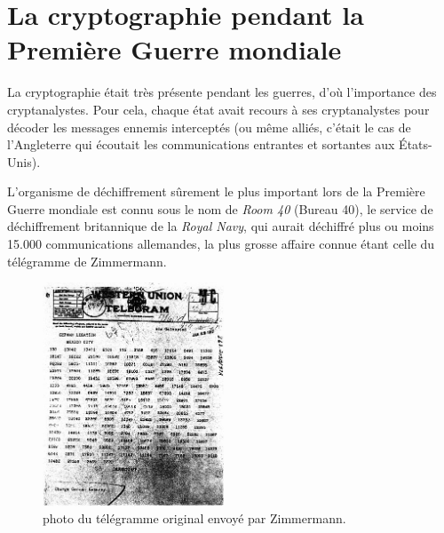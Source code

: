 \section{La cryptographie pendant la Première Guerre mondiale}
La cryptographie était très présente pendant les guerres, d'où
l'importance des crypt\-analystes. Pour cela, chaque état avait recours
à ses cryptanalystes pour décoder les messages ennemis interceptés (ou
même alliés, c'était le cas de l'Angleterre qui écoutait les
communications entrantes et sortantes aux États-Unis).

L'organisme de déchiffrement sûrement le plus important lors de la
Première Guerre mondiale
est connu sous le nom de \emph{Room 40} (Bureau 40), le service de
déchiffrement britannique de la \emph{Royal Navy}, qui aurait déchiffré
plus ou moins 15.000 communications allemandes, la plus grosse affaire
connue étant celle du télégramme de Zimmermann.
\begin{figure}
  \begin{center}
    \includegraphics[width=0.48\textwidth]{images/ZimmermanTelegram.jpg}
  \end{center}
  \caption{photo du télégramme original envoyé par Zimmermann.}
  \label{fig:Zimmerman}
  \vspace{-10pt}
\end{figure}


